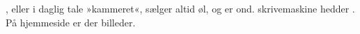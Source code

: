 \TKET, eller i daglig tale »kammeret«, sælger altid øl, og \KASS er
ond. \TKETs skrivemaskine hedder \RemToR. På \TKETs hjemmeside \TKurl
er der billeder.
